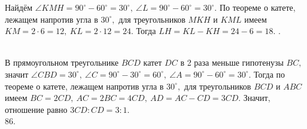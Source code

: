 \documentclass[12pt]{article}
\begin{document}
Найдём $\angle KMH=90^\circ-60^\circ=30^\circ,\ \angle L=90^\circ-60^\circ=30^\circ.$ По теореме о катете, лежащем напротив угла в $30^\circ,$ для треугольников $MKH$ и $KML$ имеем $KM=2\cdot6=12,\ KL=2\cdot12=24.$ Тогда $LH=KL-KH=24-6=18.$\newpage
{}. \begin{figure}[ht!]
\end{figure}\\
В прямоугольном треугольнике $BCD$ катет $DC$ в 2 раза меньше гипотенузы $BC,$ значит $\angle CBD=30^\circ,\ \angle C=90^\circ-30^\circ=60^\circ,\ \angle A=90^\circ-60^\circ=30^\circ.$ Тогда по теореме о катете, лежащем напротив угла в $30^\circ,$ для треугольников $BCD$ и $ABC$ имеем $BC=2CD,\ AC=2BC=4CD,\ AD=AC-CD=3CD.$ Значит, отношение равно $3CD:CD=3:1.$\\
86. \begin{figure}[ht!]
\end{figure}\\
\end{document}
